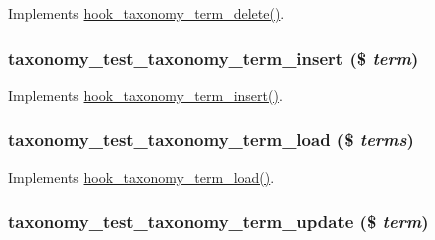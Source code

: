 \label{taxonomy__test_8module_a9d8897ea32360be0eea901c95ac73ebc}
Implements \hyperlink{group__hooks_gab55fa1f290f3d43ea59795123154cf32}{hook\_\-taxonomy\_\-term\_\-delete()}. \hypertarget{taxonomy__test_8module_a3f27e9e2da71126683ec0a6939103a87}{
\subsubsection[{taxonomy\_\-test\_\-taxonomy\_\-term\_\-insert}]{\setlength{\rightskip}{0pt plus 5cm}taxonomy\_\-test\_\-taxonomy\_\-term\_\-insert (\$ {\em term})}}
\label{taxonomy__test_8module_a3f27e9e2da71126683ec0a6939103a87}
Implements \hyperlink{group__hooks_gabab3537accc8ce17fe2cd0f73f4bb817}{hook\_\-taxonomy\_\-term\_\-insert()}. \hypertarget{taxonomy__test_8module_af46666abf27359dd595d938e7d694c5e}{
\subsubsection[{taxonomy\_\-test\_\-taxonomy\_\-term\_\-load}]{\setlength{\rightskip}{0pt plus 5cm}taxonomy\_\-test\_\-taxonomy\_\-term\_\-load (\$ {\em terms})}}
\label{taxonomy__test_8module_af46666abf27359dd595d938e7d694c5e}
Implements \hyperlink{group__hooks_ga043d5ebe3d15a7ff5a84e8016a96467f}{hook\_\-taxonomy\_\-term\_\-load()}. \hypertarget{taxonomy__test_8module_ae18572695343ab33f33ef409e2301128}{
\subsubsection[{taxonomy\_\-test\_\-taxonomy\_\-term\_\-update}]{\setlength{\rightskip}{0pt plus 5cm}taxonomy\_\-test\_\-taxonomy\_\-term\_\-update (\$ {\em term})}}
